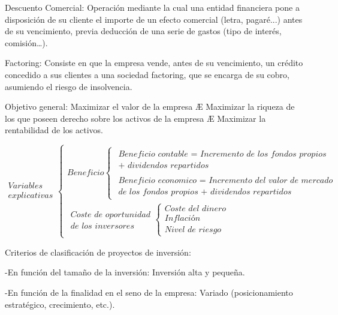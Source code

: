 \documentclass[12pt, twoside, openright]{report} %
\begin{document}
Descuento Comercial: Operación mediante la cual una entidad financiera pone a disposición de su cliente el
importe de un efecto comercial (letra, pagaré...) antes de su vencimiento, previa deducción de una serie de
gastos (tipo de interés, comisión…).

Factoring: Consiste en que la empresa vende, antes de su vencimiento, un crédito concedido a sus clientes a
una sociedad factoring, que se encarga de su cobro, asumiendo el riesgo de insolvencia.

Objetivo general: Maximizar el valor de la empresa Æ Maximizar la riqueza de los que poseen derecho sobre
los activos de la empresa Æ Maximizar la rentabilidad de los activos.

$$\begin{gathered}\textit{Variables } \\ \textit{explicativas}\end{gathered}
	\begin{cases}
		\textit{Beneficio} \begin{cases}
			\begin{gathered}\textit{Beneficio contable = Incremento de los fondos propios} \\  \textit{+ dividendos repartidos}\end{gathered} \\
			\begin{gathered}\textit{Beneficio economico = Incremento del valor de mercado} \\  \textit{de los fondos propios + dividendos repartidos} \end{gathered}
		\end{cases}       \\
		\begin{gathered}\textit{Coste de oportunidad}\\ \textit{de los inversores}\end{gathered} \begin{cases}
			\textit{Coste del dinero} \\
			\textit{Inflación}        \\
			\textit{Nivel de riesgo}
		\end{cases}
	\end{cases}$$

Criterios de clasificación de proyectos de inversión:

-En función del tamaño de la inversión: Inversión alta y pequeña.

-En función de la finalidad en el seno de la empresa: Variado (posicionamiento estratégico, crecimiento, etc.).
\end{document}
